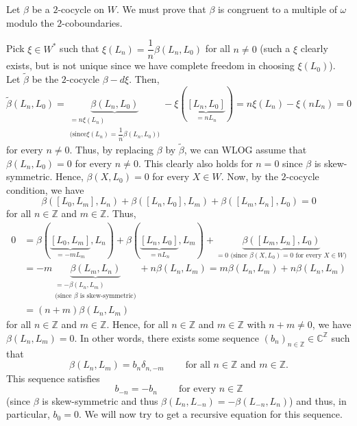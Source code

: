 \documentclass[etingof-lie.tex]{subfiles}
\begin{document}
Let $\beta$ be a $2$-cocycle on $W$. We must prove that $\beta$ is congruent
to a multiple of $\omega$ modulo the $2$-coboundaries.

Pick $\xi\in W^{\ast}$ such that $\xi\left(  L_{n}\right)  =\dfrac{1}{n}%
\beta\left(  L_{n},L_{0}\right)  $ for all $n\neq0$ (such a $\xi$ clearly
exists, but is not unique since we have complete freedom in choosing
$\xi\left(  L_{0}\right)  $). Let $\widetilde{\beta}$ be the $2$-cocycle
$\beta-d\xi$. Then,
\[
\widetilde{\beta}\left(  L_{n},L_{0}\right)  =\underbrace{\beta\left(
L_{n},L_{0}\right)  }_{\substack{=n\xi\left(  L_{n}\right)  \\\text{(since
}\xi\left(  L_{n}\right)  =\dfrac{1}{n}\beta\left(  L_{n},L_{0}\right)
\text{)}}}-\xi\left(  \underbrace{\left[  L_{n},L_{0}\right]  }_{=nL_{n}%
}\right)  =n\xi\left(  L_{n}\right)  -\xi\left(  nL_{n}\right)  =0
\]
for every $n\neq0$. Thus, by replacing $\beta$ by $\widetilde{\beta}$, we can
WLOG assume that $\beta\left(  L_{n},L_{0}\right)  =0$ for every $n\neq0$.
This clearly also holds for $n=0$ since $\beta$ is skew-symmetric. Hence,
$\beta\left(  X,L_{0}\right)  =0$ for every $X\in W$. Now, by the $2$-cocycle
condition, we have%
\[
\beta\left(  \left[  L_{0},L_{m}\right]  ,L_{n}\right)  +\beta\left(  \left[
L_{n},L_{0}\right]  ,L_{m}\right)  +\beta\left(  \left[  L_{m},L_{n}\right]
,L_{0}\right)  =0
\]
for all $n\in\mathbb{Z}$ and $m\in\mathbb{Z}$. Thus,%
\begin{align*}
0  &  =\beta\left(  \underbrace{\left[  L_{0},L_{m}\right]  }_{=-mL_{m}}%
,L_{n}\right)  +\beta\left(  \underbrace{\left[  L_{n},L_{0}\right]
}_{=nL_{n}},L_{m}\right)  +\underbrace{\beta\left(  \left[  L_{m}%
,L_{n}\right]  ,L_{0}\right)  }_{=0\text{ (since }\beta\left(  X,L_{0}\right)
=0\text{ for every }X\in W\text{)}}\\
&  =-m\underbrace{\beta\left(  L_{m},L_{n}\right)  }_{\substack{=-\beta\left(
L_{n},L_{m}\right)  \\\text{(since }\beta\text{ is skew-symmetric)}}%
}+n\beta\left(  L_{n},L_{m}\right)  =m\beta\left(  L_{n},L_{m}\right)
+n\beta\left(  L_{n},L_{m}\right) \\
&  =\left(  n+m\right)  \beta\left(  L_{n},L_{m}\right)
\end{align*}
for all $n\in\mathbb{Z}$ and $m\in\mathbb{Z}$. Hence, for all $n\in\mathbb{Z}$
and $m\in\mathbb{Z}$ with $n+m\neq0$, we have $\beta\left(  L_{n}%
,L_{m}\right)  =0$. In other words, there exists some sequence $\left(
b_{n}\right)  _{n\in\mathbb{Z}}\in\mathbb{C}^{\mathbb{Z}}$ such that
\begin{equation}
\beta\left(  L_{n},L_{m}\right)  =b_{n}\delta_{n,-m}%
\ \ \ \ \ \ \ \ \ \ \text{for all }n\in\mathbb{Z}\text{ and }m\in\mathbb{Z}.
\label{thm.H^2(W).pf.2}%
\end{equation}
This sequence satisfies
\begin{equation}
b_{-n}=-b_{n}\ \ \ \ \ \ \ \ \ \ \text{for every }n\in\mathbb{Z}
\label{thm.H^2(W).pf.1}%
\end{equation}
(since $\beta$ is skew-symmetric and thus $\beta\left(  L_{n},L_{-n}\right)
=-\beta\left(  L_{-n},L_{n}\right)  $) and thus, in particular, $b_{0}=0$. We
will now try to get a recursive equation for this sequence.
\end{document}
